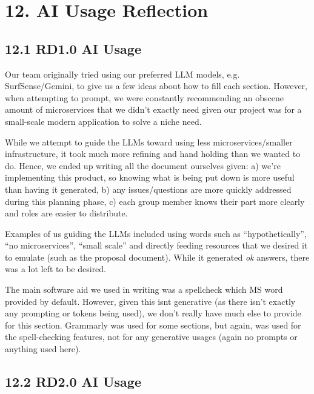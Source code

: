 \hypertarget{ai-usage-reflection}{%
\section{12. AI Usage Reflection}\label{ai-usage-reflection}}

\hypertarget{rd1.0-ai-usage}{%
\subsection{12.1 RD1.0 AI Usage}\label{rd1.0-ai-usage}}

Our team originally tried using our preferred LLM models, e.g.
SurfSense/Gemini, to give us a few ideas about how to fill each section.
However, when attempting to prompt, we were constantly recommending an
obscene amount of microservices that we didn't exactly need given our
project was for a small-scale modern application to solve a niche need.

While we attempt to guide the LLMs toward using less
microservices/smaller infrastructure, it took much more refining and
hand holding than we wanted to do. Hence, we ended up writing all the
document ourselves given: a) we're implementing this product, so knowing
what is being put down is more useful than having it generated, b) any
issues/questions are more quickly addressed during this planning phase,
c) each group member knows their part more clearly and roles are easier
to distribute.

Examples of us guiding the LLMs included using words such as
``hypothetically'', ``no microservices'', ``small scale'' and directly
feeding resources that we desired it to emulate (such as the proposal
document). While it generated \emph{ok} answers, there was a lot left to
be desired.

The main software aid we used in writing was a spellcheck which MS word
provided by default. However, given this isn\textquotesingle t
generative (as there isn't exactly any prompting or tokens being used),
we don't really have much else to provide for this section. Grammarly
was used for some sections, but again, was used for the spell-checking
features, not for any generative usages (again no prompts or anything
used here).

\hypertarget{rd2.0-ai-usage}{%
\subsection{12.2 RD2.0 AI Usage}\label{rd2.0-ai-usage}}

